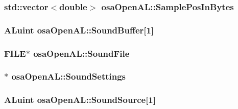 \hypertarget{classosa_open_a_l_a91923ec0ba88fb79b905e16436e6b788}{
\subsubsection[{Sample\-Pos\-In\-Bytes}]{\setlength{\rightskip}{0pt plus 5cm}std\-::vector$<$double$>$ osa\-Open\-A\-L\-::\-Sample\-Pos\-In\-Bytes\hspace{0.3cm}{\ttfamily [protected]}}}\label{classosa_open_a_l_a91923ec0ba88fb79b905e16436e6b788}
\hypertarget{classosa_open_a_l_ac6e799e37b8a7558bd5e292fa58d3c3c}{
\subsubsection[{Sound\-Buffer}]{\setlength{\rightskip}{0pt plus 5cm}A\-Luint osa\-Open\-A\-L\-::\-Sound\-Buffer\mbox{[}1\mbox{]}\hspace{0.3cm}{\ttfamily [protected]}}}\label{classosa_open_a_l_ac6e799e37b8a7558bd5e292fa58d3c3c}
\hypertarget{classosa_open_a_l_ad40ecd04c4a4635dfc2bbe94b06d026a}{
\subsubsection[{Sound\-File}]{\setlength{\rightskip}{0pt plus 5cm}F\-I\-L\-E$\ast$ osa\-Open\-A\-L\-::\-Sound\-File\hspace{0.3cm}{\ttfamily [protected]}}}\label{classosa_open_a_l_ad40ecd04c4a4635dfc2bbe94b06d026a}
\hypertarget{classosa_open_a_l_a2f56685041b72f0338a27e6409f52387}{
\subsubsection[{Sound\-Settings}]{$\ast$ osa\-Open\-A\-L\-::\-Sound\-Settings\hspace{0.3cm}{\ttfamily [protected]}}}\label{classosa_open_a_l_a2f56685041b72f0338a27e6409f52387}
\hypertarget{classosa_open_a_l_a6576f5499b534447b0e0e11ee0edb2e6}{
\subsubsection[{Sound\-Source}]{\setlength{\rightskip}{0pt plus 5cm}A\-Luint osa\-Open\-A\-L\-::\-Sound\-Source\mbox{[}1\mbox{]}\hspace{0.3cm}{\ttfamily [protected]}}}\label{classosa_open_a_l_a6576f5499b534447b0e0e11ee0edb2e6}
